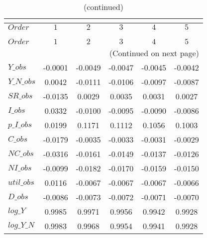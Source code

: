  
\begin{center}
\begin{longtable}{lccccc} 
\caption{COEFFICIENTS OF AUTOCORRELATION}\\
 \label{Table:th_autocorr_matrix}\\
\toprule 
$Order      $	 & 	 $          1$	 & 	 $          2$	 & 	 $          3$	 & 	 $          4$	 & 	 $          5$\\
\midrule \endfirsthead 
\caption{(continued)}\\
 \toprule \\ 
$Order      $	 & 	 $          1$	 & 	 $          2$	 & 	 $          3$	 & 	 $          4$	 & 	 $          5$\\
\midrule \endhead 
\midrule \multicolumn{6}{r}{(Continued on next page)} \\ \bottomrule \endfoot 
\bottomrule \endlastfoot 
$Y\_obs     $	 & 	    -0.0001	 & 	    -0.0049	 & 	    -0.0047	 & 	    -0.0045	 & 	    -0.0042 \\ 
$Y\_N\_obs  $	 & 	     0.0042	 & 	    -0.0111	 & 	    -0.0106	 & 	    -0.0097	 & 	    -0.0087 \\ 
$SR\_obs    $	 & 	    -0.0135	 & 	     0.0029	 & 	     0.0035	 & 	     0.0031	 & 	     0.0027 \\ 
$I\_obs     $	 & 	     0.0332	 & 	    -0.0100	 & 	    -0.0095	 & 	    -0.0090	 & 	    -0.0086 \\ 
$p\_I\_obs  $	 & 	     0.0199	 & 	     0.1171	 & 	     0.1112	 & 	     0.1056	 & 	     0.1003 \\ 
$C\_obs     $	 & 	    -0.0179	 & 	    -0.0035	 & 	    -0.0033	 & 	    -0.0031	 & 	    -0.0029 \\ 
$NC\_obs    $	 & 	    -0.0316	 & 	    -0.0161	 & 	    -0.0149	 & 	    -0.0137	 & 	    -0.0126 \\ 
$NI\_obs    $	 & 	    -0.0099	 & 	    -0.0182	 & 	    -0.0170	 & 	    -0.0159	 & 	    -0.0150 \\ 
$util\_obs  $	 & 	     0.0116	 & 	    -0.0067	 & 	    -0.0067	 & 	    -0.0067	 & 	    -0.0066 \\ 
$D\_obs     $	 & 	    -0.0086	 & 	    -0.0073	 & 	    -0.0072	 & 	    -0.0071	 & 	    -0.0070 \\ 
$log\_Y     $	 & 	     0.9985	 & 	     0.9971	 & 	     0.9956	 & 	     0.9942	 & 	     0.9928 \\ 
$log\_Y\_N  $	 & 	     0.9983	 & 	     0.9968	 & 	     0.9954	 & 	     0.9941	 & 	     0.9928 \\ 

\end{longtable}
\end{center}
